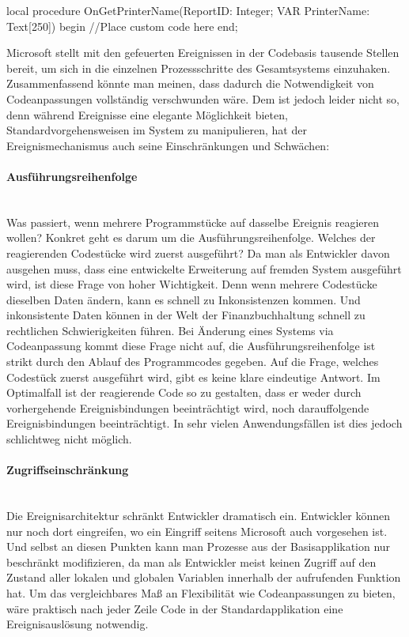 \begin{program}[H]  %
	\begin{JavaCode}
  local procedure OnGetPrinterName(ReportID: Integer; VAR PrinterName: Text[250])
  begin
    //Place custom code here
  end;\end{JavaCode}
\end{program}

Microsoft stellt mit den gefeuerten Ereignissen in der Codebasis tausende Stellen bereit, um sich in die einzelnen Prozessschritte des Gesamtsystems einzuhaken. Zusammenfassend könnte man meinen, dass dadurch die Notwendigkeit von Codeanpassungen vollständig verschwunden wäre. Dem ist jedoch leider nicht so, denn während Ereignisse eine elegante Möglichkeit bieten, Standardvorgehensweisen im System zu manipulieren, hat der Ereignismechanismus auch seine Einschränkungen und Schwächen:

\paragraph{Ausführungsreihenfolge} \mbox{}\\
Was passiert, wenn mehrere Programmstücke auf dasselbe Ereignis reagieren wollen? Konkret geht es darum um die Ausführungsreihenfolge. Welches der reagierenden Codestücke wird zuerst ausgeführt? Da man als Entwickler davon ausgehen muss, dass eine entwickelte Erweiterung auf fremden System ausgeführt wird, ist diese Frage von hoher Wichtigkeit. Denn wenn mehrere Codestücke dieselben Daten ändern, kann es schnell zu Inkonsistenzen kommen. Und inkonsistente Daten können in der Welt der Finanzbuchhaltung schnell zu rechtlichen Schwierigkeiten führen. Bei Änderung eines Systems via Codeanpassung kommt diese Frage nicht auf, die Ausführungsreihenfolge ist strikt durch den Ablauf des Programmcodes gegeben. Auf die Frage, welches Codestück zuerst ausgeführt wird, gibt es keine klare eindeutige Antwort. Im Optimalfall ist der reagierende Code so zu gestalten, dass er weder durch vorhergehende Ereignisbindungen beeinträchtigt wird, noch darauffolgende Ereignisbindungen beeinträchtigt. In sehr vielen Anwendungsfällen ist dies jedoch schlichtweg nicht möglich.

\paragraph{Zugriffseinschränkung} \mbox{}\\
Die Ereignisarchitektur schränkt Entwickler dramatisch ein. Entwickler können nur noch dort eingreifen, wo ein Eingriff seitens Microsoft auch vorgesehen ist. Und selbst an diesen Punkten kann man Prozesse aus der Basisapplikation nur beschränkt modifizieren, da man als Entwickler meist keinen Zugriff auf den Zustand aller lokalen und globalen Variablen innerhalb der aufrufenden Funktion hat. Um das vergleichbares Maß an Flexibilität wie Codeanpassungen zu bieten, wäre praktisch nach jeder Zeile Code in der Standardapplikation eine Ereignisauslösung notwendig.


